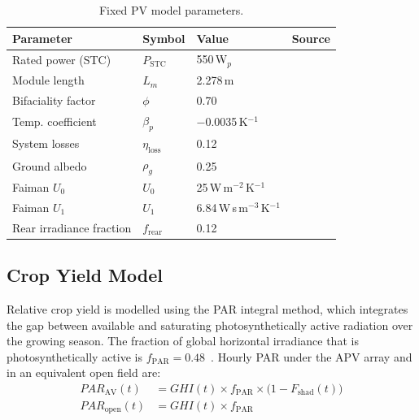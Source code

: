 \begin{table}[H]
\caption{Fixed PV model parameters.}
\label{tab:pvparams}
\centering
\begin{tabular}{llll}
\toprule
\textbf{Parameter} & \textbf{Symbol} & \textbf{Value} & \textbf{Source} \\
\midrule
Rated power (STC)       & $P_{\text{STC}}$ & 550\,W$_p$          & \citet{jinko} \\
Module length           & $L_m$            & 2.278\,m            & \citet{jinko} \\
Bifaciality factor      & $\phi$           & 0.70                & \citet{jinko} \\
Temp. coefficient       & $\beta_p$        & $-$0.0035\,K$^{-1}$ & \citet{jinko} \\
System losses           & $\eta_{\text{loss}}$ & 0.12            & \citet{jordan2013} \\
Ground albedo           & $\rho_g$         & 0.25                & \citet{monteith2008} \\
Faiman $U_0$            & $U_0$            & 25\,W\,m$^{-2}$\,K$^{-1}$ & \citet{faiman2008} \\
Faiman $U_1$            & $U_1$            & 6.84\,W\,s\,m$^{-3}$\,K$^{-1}$ & \citet{faiman2008} \\
Rear irradiance fraction & $f_{\text{rear}}$ & 0.12             & \citet{gorjian_progress_2022} \\
\bottomrule
\end{tabular}
\end{table}

\subsection{Crop Yield Model}
\label{sec:cropyield}

\hspace{1cm}Relative crop yield is modelled using the PAR integral
method, which integrates the gap between available and saturating
photosynthetically active radiation over the growing season. The fraction
of global horizontal irradiance that is photosynthetically active
is $f_{\text{PAR}} = 0.48$~\citep{mccree1971, jacovides2006}. Hourly
PAR under the APV array and in an equivalent open field are:
\begin{align}
    PAR_{\text{AV}}(t)   &= GHI(t) \times f_{\text{PAR}}
        \times \bigl(1 - F_{\text{shad}}(t)\bigr)
        \label{eq:parav} \\
    PAR_{\text{open}}(t) &= GHI(t) \times f_{\text{PAR}}
        \label{eq:paropen}
\end{align}

